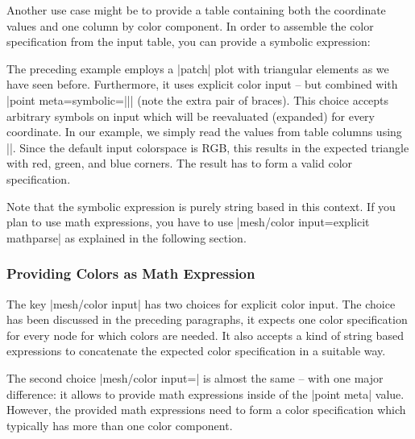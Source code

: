 {{Another use case might be to provide a table containing both the coordinate
values and one column by color component. In order to assemble the color
specification from the input table, you can provide a symbolic expression:
%
\begin{codeexample}[]
\end{codeexample}
%
The preceding example employs a |patch| plot with triangular elements as we
have seen before. Furthermore, it uses explicit color input -- but combined
with |point meta={symbolic=||}| (note the extra pair of braces).
This choice accepts arbitrary symbols on input which will be reevaluated
(expanded) for every coordinate. In our example, we simply read the values from
table columns using |\thisrow|. Since the default input colorspace is RGB, this
results in the expected triangle with red, green, and blue corners. The result
has to form a valid color specification.

Note that the symbolic expression is purely string based in this context. If
you plan to use math expressions, you have to use
|mesh/color input=explicit mathparse| as explained in the following section.


\subsubsection{Providing Colors as Math Expression}
\label{sec:surf:explicit:color:math}

The key |mesh/color input| has two choices for explicit color input. The choice
 has been discussed in the preceding paragraphs, it
expects one color specification for every node for which colors are needed. It
also accepts a kind of string based expressions to concatenate the expected
color specification in a suitable way.

The second choice |mesh/color input=| is almost
the same -- with one major difference: it allows to provide math expressions
inside of the |point meta| value. However, the provided math expressions need
to form a color specification which typically has more than one color
component.

}}
